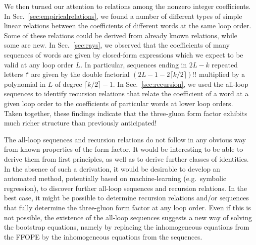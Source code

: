 \documentclass[12pt]{article}
\begin{document}
We then turned our attention to relations among the nonzero integer coefficients. In Sec.~\ref{sec:empiricalrelations}, we found a number of different types of simple linear relations between the coefficients of different words at the same loop order. Some of these relations could be derived from already known relations, while some are new.  In Sec.~\ref{sec:rays}, we observed that the coefficients of many sequences of words are given by closed-form expressions which we expect to be valid at any loop order $L$. In particular, sequences ending in $2L-k$ repeated letters {\tt f} are given by the double factorial $(2L-1-2\lceil{k/2}\rceil)!!$ multiplied by a polynomial in $L$ of degree $\lceil{k/2}\rceil-1$.  In Sec.~\ref{sec:recursion}, we used the all-loop sequences to identify recursion relations that relate the coefficient of a word at a given loop order to the coefficients of particular words at lower loop orders.  Taken together, these findings indicate that the three-gluon form factor exhibits much richer structure than previously anticipated!  

 
 The all-loop sequences and recursion relations do not follow in any obvious way from known properties of the form factor.  It would be interesting to be able to derive them from first principles, as well as to derive further classes of identities. In the absence of such a derivation, it would be desirable to develop an automated method, potentially based on machine-learning (e.g.~symbolic regression), to discover further all-loop sequences and recursion relations. In the best case, it might be possible to determine recursion relations and/or sequences that fully determine the three-gluon form factor at any loop order. Even if this is not possible, the existence of the all-loop sequences suggests a new way of solving the bootstrap equations, namely by replacing the inhomogeneous equations from the FFOPE by the inhomogeneous equations from the sequences.
\end{document}
